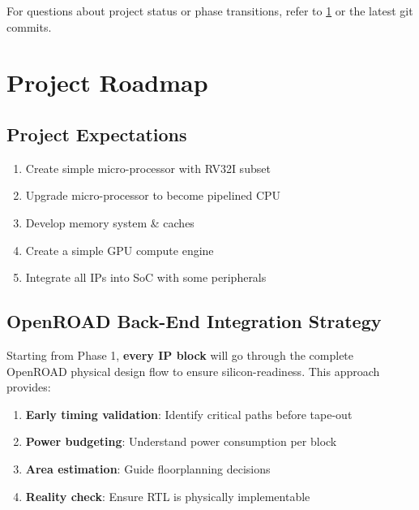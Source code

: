 \begin{record}

For questions about project status or phase transitions, refer to
\cref{cr:status:roadmap} or the latest git commits.

\end{record}

\section{Project Roadmap}\label{cr:status:roadmap}

\subsection{Project Expectations}\label{cr:status:roadmap:project-expectations}

\begin{record}

\begin{enumerate}
\def\labelenumi{\arabic{enumi}.}
\tightlist
\item
  Create simple micro-processor with RV32I subset
\item
  Upgrade micro-processor to become pipelined CPU
\item
  Develop memory system \& caches
\item
  Create a simple GPU compute engine
\item
  Integrate all IPs into SoC with some peripherals
\end{enumerate}

\end{record}

\subsection{OpenROAD Back-End Integration Strategy}\label{cr:status:roadmap:openroad-back-end-integration-strategy}

\begin{record}

Starting from Phase 1, \textbf{every IP block} will go through the
complete OpenROAD physical design flow to ensure silicon-readiness. This
approach provides:

\begin{enumerate}
\def\labelenumi{\arabic{enumi}.}
\tightlist
\item
  \textbf{Early timing validation}: Identify critical paths before
  tape-out
\item
  \textbf{Power budgeting}: Understand power consumption per block
\item
  \textbf{Area estimation}: Guide floorplanning decisions
\item
  \textbf{Reality check}: Ensure RTL is physically implementable
\end{enumerate}

\end{record}

